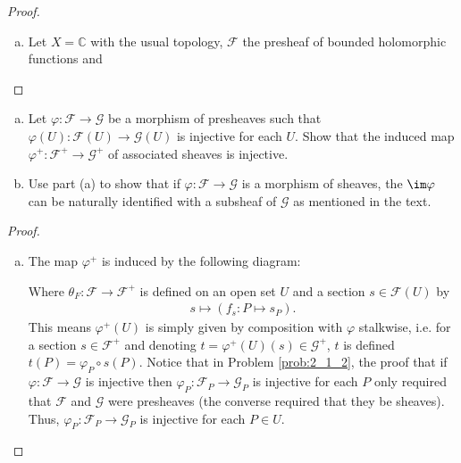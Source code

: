 \begin{problemset}
\begin{proof}
\begin{enumerate}[(a)]
			\item Let $X = \mathbb C$ with the usual topology, $\mathcal F$ the presheaf of bounded holomorphic functions and 
		\end{enumerate}
	\end{proof}
\item \label{prob:2_1_4}
	\begin{enumerate}[(a)]
		\item Let $\varphi:\mathcal F\to \mathcal G$ be a morphism of presheaves such that $\varphi(U):\mathcal F(U)\to \mathcal G(U)$ is injective for each $U$. Show that the induced map $\varphi^+:\mathcal F^+ \to \mathcal G^+$ of associated sheaves is injective.
		\item Use part (a) to show that if $\varphi:\mathcal F\to \mathcal G$ is a morphism of sheaves, the $\im \varphi$ can be naturally identified with a subsheaf of $\mathcal G$ as mentioned in the text.
	\end{enumerate}
	\begin{proof}$ $
		\begin{enumerate}[(a)]
			\item The map $\varphi^+$ is induced by the following diagram:
				\begin{center}
				\end{center}
				Where $\theta_F:\mathcal F\to \mathcal F^+$ is defined on an open set $U$ and a section $s\in \mathcal F(U)$ by
				\begin{align*}
					s\mapsto (f_s:P\mapsto s_P).
				\end{align*}
				This means $\varphi^+(U)$ is simply given by composition with $\varphi$ stalkwise, i.e. for a section $s\in \mathcal F^+$ and denoting $t = \varphi^+(U)(s) \in \mathcal G^+$, $t$ is defined $t(P) = \varphi_P\circ s(P).$ Notice that in Problem \ref{prob:2_1_2}, the proof that if $\varphi:\mathcal F\to \mathcal G$ is injective then $\varphi_P:\mathcal F_P\to \mathcal G_P$ is injective for each $P$ only required that $\mathcal F$ and $\mathcal G$ were presheaves (the converse required that they be sheaves). Thus, $\varphi_P:\mathcal F_P\to \mathcal G_P$ is injective for each $P\in U$.

\end{enumerate}
\end{proof}
\end{problemset}
